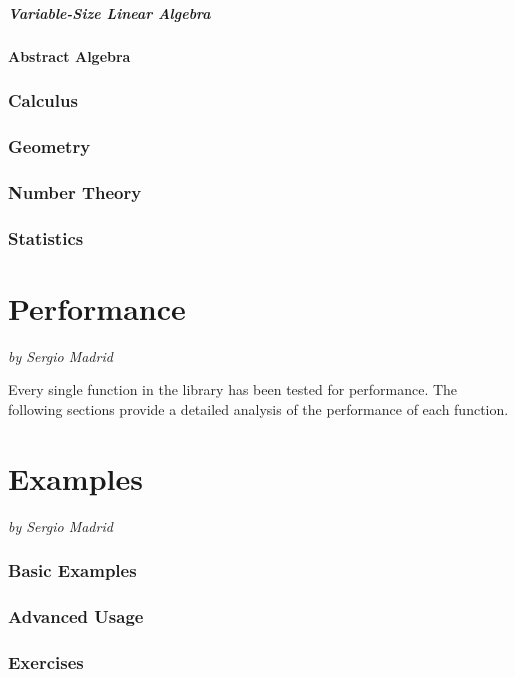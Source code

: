 \documentclass[a4paper,oneside,8pt]{extarticle}
\newcommand{\authoredpart}[2]{
  \clearpage
  \part{#1}
  \vspace{-1em} %
  \Large{\textit{by #2}}
  \vspace{2em} %
}
\theoremstyle{definition}
\begin{document}
\subsubsection{Variable-Size Linear Algebra}

\subsection{Abstract Algebra}

\section{Calculus} \label{sec:calculus}

\section{Geometry} \label{sec:geometry}

\section{Number Theory} \label{sec:number_theory}

\section{Statistics} \label{sec:statistics}


\authoredpart{Performance}{Sergio Madrid}

Every single function in the library has been tested for performance. The following sections provide a detailed analysis of the performance of each function.

\authoredpart{Examples}{Sergio Madrid}

\section{Basic Examples}

\section{Advanced Usage}

\section{Exercises}

\end{document}
